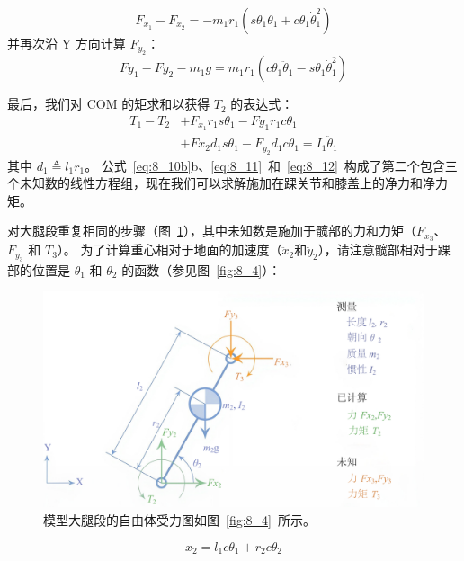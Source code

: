 \begin{equation}
	F_{x_1} - F_{x_2} = 
		- m_1 r_1 
		(
			s \theta_1 \ddot{\theta}_1 + 
			c \theta_1 \dot{\theta}_1^2
		)
	\label{eq:8_10b}
\end{equation}
%
并再次沿 Y 方向计算 $F_{y_2}$：
\begin{equation}
	F y_1 - F y_2 - m_1 g  =  
		m_1 r_1
		(
			c \theta_1 \ddot{ \theta }_1 -
			s \theta_1 \dot{ \theta }_1^2
		)
	\label{eq:8_11}
\end{equation}

最后，我们对 COM 的矩求和以获得 $T_2$ 的表达式：
%
\begin{equation}
	\begin{aligned}
		T_1 - T_2 & + F_{x_1} r_1 s \theta_1 - F y_1 r_1 c \theta_1 \\
		& + F x_2 d_1 s \theta_1  -
			F_{y_2} d_1 c \theta_1
			= I_1 \ddot{\theta}_1
	\end{aligned}
	\label{eq:8_12}
\end{equation}
%
其中 $d_1 \triangleq l_1 r_1$。
公式~\ref{eq:8_10b}b、\ref{eq:8_11}~和~\ref{eq:8_12}~构成了第二个包含三个未知数的线性方程组，现在我们可以求解施加在踝关节和膝盖上的净力和净力矩。


对大腿段重复相同的步骤（图~\ref{fig:8_7}），其中未知数是施加于髋部的力和力矩（$F_{x_3}$、$F_{y_3}$ 和 $T_3$）。
为了计算重心相对于地面的加速度（$\ddot{x}_2$和$\ddot{y}_2$），请注意髋部相对于踝部的位置是 $\theta_1$ 和 $\theta_2$ 的函数（参见图~\ref{fig:8_4}）：

\begin{figure}[!htb]
	\centering
	\includegraphics[width=0.85\linewidth]{chap8/8_7}
	\caption{模型大腿段的自由体受力图如图~\ref{fig:8_4}~所示。 \label{fig:8_7}}
\end{figure}

\begin{equation}
	x_2 = l_1 c \theta_1  +  r_2 c \theta_2
	\label{eq:8_13a}
\end{equation}


